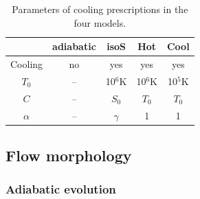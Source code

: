 \documentclass{aa}
\begin{document}
\begin{table}
\centering
\caption{Parameters of cooling prescriptions in the four models.}
\label{tab:cool}
\begin{tabularx}{0.78\columnwidth}{c|c|c|c|c}
   & adiabatic & isoS & Hot & Cool\\
  \hline
  Cooling & no & yes & yes & yes \\  
  $T_0$ & -- & 10$^6$K & 10$^6$K & 10$^5$K \\
  $C$ & -- & $S_0$ & $T_0$ & $T_0$ \\
  $\alpha$ & -- & $\gamma$ & 1 & 1 \\
\end{tabularx}
\end{table}

\subsection{Flow morphology}
\label{sec:morph}

\subsubsection{Adiabatic evolution}
\label{sec:cool_F}
\end{document}

